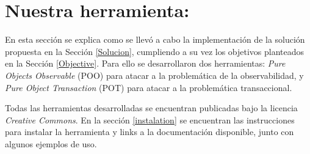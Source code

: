 \section{Nuestra herramienta: }
\label{Implementacion}

	En esta sección se explica como se llevó a cabo la implementación de la solución
	propuesta en la Sección \ref{Solucion}, cumpliendo a su vez los objetivos
	planteados en la Sección \ref{Objective}. Para ello se desarrollaron dos
	herramientas:
	\emph{Pure Objects Observable} (POO) para atacar a la problemática de la
	observabilidad, y \emph{Pure Object Transaction} (POT) para atacar a la
	problemática transaccional.

	Todas las herramientas desarrolladas se encuentran publicadas bajo la licencia \emph{Creative Commons}.
	En la sección \ref{instalation} se encuentran las instrucciones para instalar la herramienta y 
	links a la documentación disponible, junto con algunos ejemplos de uso.
	




